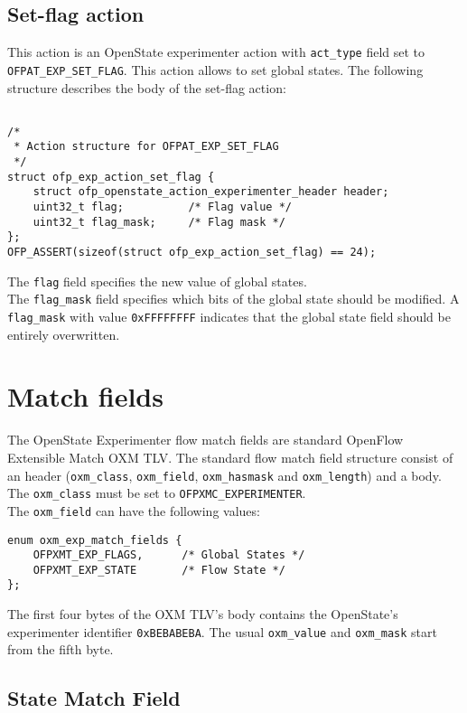 \subsection{Set-flag action}
\label{sec:set_flag_action_proto}

This action is an OpenState experimenter action with \texttt{act\_type} field set to \texttt{OFPAT\_EXP\_SET\_FLAG}. This action allows to set global states. The following structure describes the body of the set-flag action:

\scriptsize\begin{verbatim}

/*
 * Action structure for OFPAT_EXP_SET_FLAG
 */
struct ofp_exp_action_set_flag {
    struct ofp_openstate_action_experimenter_header header;
    uint32_t flag;          /* Flag value */
    uint32_t flag_mask;     /* Flag mask */
};
OFP_ASSERT(sizeof(struct ofp_exp_action_set_flag) == 24);
\end{verbatim}\normalsize
The \texttt{flag} field specifies the new value of global states.
\\
The \texttt{flag\_mask} field specifies which bits of the global state should be modified. A \texttt{flag\_mask} with value \texttt{0xFFFFFFFF} indicates that the global state field should be entirely overwritten.

\section{Match fields}

The OpenState Experimenter flow match fields are standard OpenFlow Extensible Match OXM TLV. The standard flow match field structure consist of an header (\texttt{oxm\_class}, \texttt{oxm\_field}, \texttt{oxm\_hasmask} and \texttt{oxm\_length}) and a body.
\\
The \texttt{oxm\_class} must be set to \texttt{OFPXMC\_EXPERIMENTER}.
\\
The \texttt{oxm\_field} can have the following values:

\scriptsize\begin{verbatim}
enum oxm_exp_match_fields {
    OFPXMT_EXP_FLAGS,      /* Global States */
    OFPXMT_EXP_STATE       /* Flow State */
};
\end{verbatim}\normalsize
The first four bytes of the OXM TLV’s body contains the OpenState's experimenter identifier \texttt{0xBEBABEBA}. The usual \texttt{oxm\_value} and \texttt{oxm\_mask} start from the fifth byte.

\subsection{State Match Field}
\label{sec:match_state}

